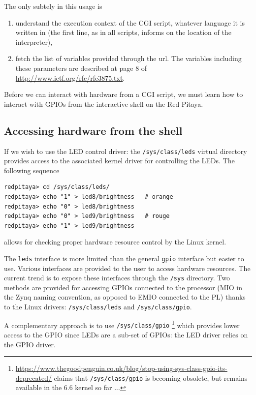 \documentclass{article}
\begin{document}
{The only subtely in this usage is
\begin{enumerate}
\item understand the execution context of the CGI script, whatever language it is written in
(the first line, as in all scripts, informs on the location of the interpreter),
\item fetch the list of variables provided through the url. The variables including these
parameters are described at page 8 of \url{http://www.ietf.org/rfc/rfc3875.txt}.
\end{enumerate}

Before we can interact with hardware from a CGI script, we must learn how to interact with
GPIOs from the interactive shell on the Red Pitaya.

\subsection{Accessing hardware from the shell}\label{acces_led}

If we wish to use the LED control driver: the {\tt /sys/class/leds} virtual directory
provides access to the associated kernel driver for controlling the LEDs. The following sequence
{\footnotesize
\begin{verbatim}
redpitaya> cd /sys/class/leds/
redpitaya> echo "1" > led8/brightness   # orange
redpitaya> echo "0" > led8/brightness 
redpitaya> echo "0" > led9/brightness   # rouge
redpitaya> echo "1" > led9/brightness 
\end{verbatim}
}
allows for checking proper hardware resource control by the Linux kernel.

The {\tt leds} interface is more limited than the general {\tt gpio} interface but 
easier to use. Various interfaces are provided to the user to access hardware resources.
The current trend is to expose these interfaces through the {\tt /sys} directory. 
Two methods are provided for accessing GPIOs connected to the processor (MIO in the Zynq
naming convention, as opposed to EMIO connected to the PL) thanks to the Linux drivers: 
{\tt /sys/class/leds} and {\tt /sys/class/gpio}.

A complementary approach is to use {\tt /sys/class/gpio}
\footnote{\url{https://www.thegoodpenguin.co.uk/blog/stop-using-sys-class-gpio-its-deprecated/} claims
that {\tt /sys/class/gpio} is becoming obsolete, but remains available in the 6.6 kernel so far ...} which provides lower access
to the GPIO since LEDs are a sub-set of GPIOs: the LED driver relies on the GPIO driver.

}
\end{document}
